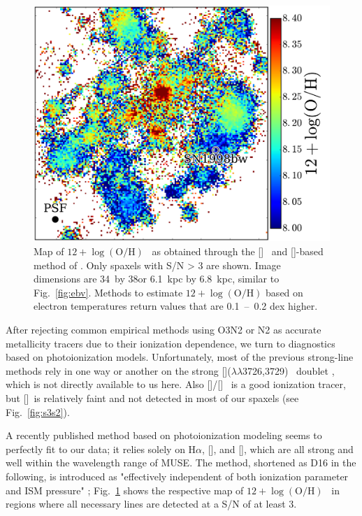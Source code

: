 \documentclass[traditabstract]{aa}
\newcommand{\ha}{H$\alpha$}
\newcommand{\oh}{12+\log(\mathrm{O/H})}
\newcommand{\sii}{[\ion{S}{ii}]}
\newcommand{\siii}{[\ion{S}{iii}]}
\newcommand{\oii}{[\ion{O}{ii}]}
\newcommand{\nii}{[\ion{N}{ii}]}
\begin{document}
\begin{figure}
\includegraphics[angle=0, width=0.99\columnwidth]{Figs/MUSE_SN1998bw_OH.pdf}
\caption{Map of $\oh$~ as obtained through the \sii~ and \nii-based method of \citet{2016Ap&SS.361...61D}. Only spaxels with {S/N > 3} are shown. Image dimensions are 34\arcsec~by 38\arcsec or 6.1~kpc by 6.8~kpc, similar to Fig.~\ref{fig:ebv}. Methods to estimate $\oh$ based on electron temperatures return values that are 0.1~--~0.2 dex higher.}
\label{fig:s2}
\end{figure}

After rejecting common empirical methods using O3N2 or N2 as accurate metallicity tracers due to their ionization dependence, we turn to diagnostics based on photoionization models. Unfortunately, most of the previous strong-line methods rely in one way or another on the strong \oii($\lambda\lambda$3726,3729)~ doublet \citep{2002ApJS..142...35K}, which is not directly available to us here. Also \siii/\sii~ is a good ionization tracer, but \siii~is relatively faint and not detected in most of our spaxels (see Fig.~\ref{fig:s3s2}). 

A recently published method based on photoionization modeling \citep{2016Ap&SS.361...61D} seems to perfectly fit to our data; it relies solely on \ha, \nii, and \sii, which are all strong and well within the wavelength range of MUSE. The method, shortened as D16 in the following, is introduced as "effectively independent of both ionization parameter and ISM pressure" \citep{2016Ap&SS.361...61D};  Fig.~\ref{fig:s2} shows the respective map of $\oh$~ in regions where all necessary lines are detected at a S/N of at least 3.
\end{document}
